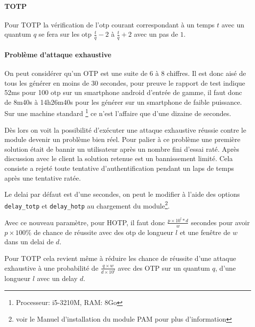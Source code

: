 \paragraph{TOTP}
Pour TOTP la vérification de l'otp courant correspondant à un temps $t$ avec un 
quantum $q$ se fera sur les otp $\frac{t}{q} - 2$ à $\frac{t}{q} + 2$ avec un 
pas de $1$.
\paragraph{Problème d'attaque exhaustive}
On peut considérer qu'un OTP est une suite de 6 à 8 chiffres. Il est donc aisé 
de tous les générer en moins de 30 secondes, pour preuve le rapport de test 
indique 52ms pour 100 otp sur un smartphone android d'entrée de gamme, 
il faut donc de 8m40s à 14h26m40s pour les générer sur un smartphone de faible 
puissance. Sur une machine standard \footnote{Processeur: i5-3210M, RAM: 8Go} ce 
n'est l'affaire que d'une dizaine de secondes. 

Dès lors on voit la possibilité d'exécuter une attaque exhaustive réussie contre 
le module devenir un problème bien réel. Pour palier à ce problème une première 
solution était de bannir un utilisateur après un nombre fini d'essai raté. Après 
discussion avec le client la solution retenue est un bannissement limité. Cela 
consiste a rejeté toute tentative d'authentification pendant un laps de temps 
après une tentative ratée.

Le delai par défaut est d'une secondes, on peut le modifier à l'aide des options 
\verb?delay_totp? et \verb?delay_hotp? au chargement du module\footnote{voir le 
Manuel d'installation du module PAM pour plus d'information}.

Avec ce nouveau paramètre, pour HOTP, il faut donc $\frac{p\times10^{l}*d}{w}$ 
secondes pour avoir $p\times100\%$ de chance de réussite avec des otp de 
longueur $l$ et une fenêtre de $w$ dans un delai de $d$.

Pour TOTP cela revient même à réduire les chance de réussite d'une attaque 
exhaustive à une probabilité de $\frac{q\times w}{d\times10^{l}}$ avec des OTP 
sur un quantum $q$, d'une longueur $l$ avec un delay $d$. 

